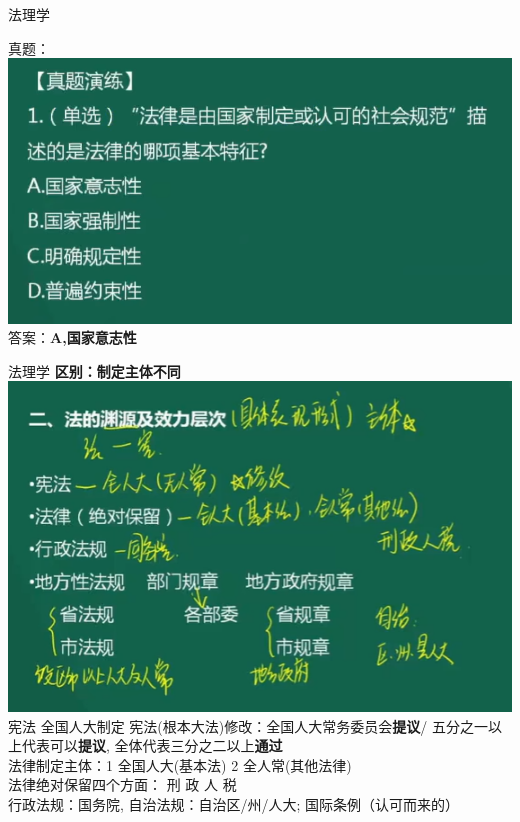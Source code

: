 \documentclass[aspectratio=169]{beamer}
\begin{document}
\begin{frame}[t]{法理学}

    真题：\\
    \includegraphics[scale=0.3]{001}\\ 
    答案：\textbf{A,国家意志性}\\
\end{frame}



\begin{frame}[t]{法理学}
    \textbf{区别：制定主体不同}\\
    \includegraphics[scale=0.3]{law_scope}\\ 
    宪法 全国人大制定
    宪法(根本大法)修改：全国人大常务委员会\textbf{提议}/ 五分之一以上代表可以\textbf{提议}, 全体代表三分之二以上\textbf{通过}\\
    法律制定主体：1 全国人大(基本法) 2 全人常(其他法律)\\
    法律绝对保留四个方面： 刑 政 人 税\\
    行政法规：国务院, 自治法规：自治区/州/人大; 国际条例（认可而来的）
\end{frame}
\end{document}
